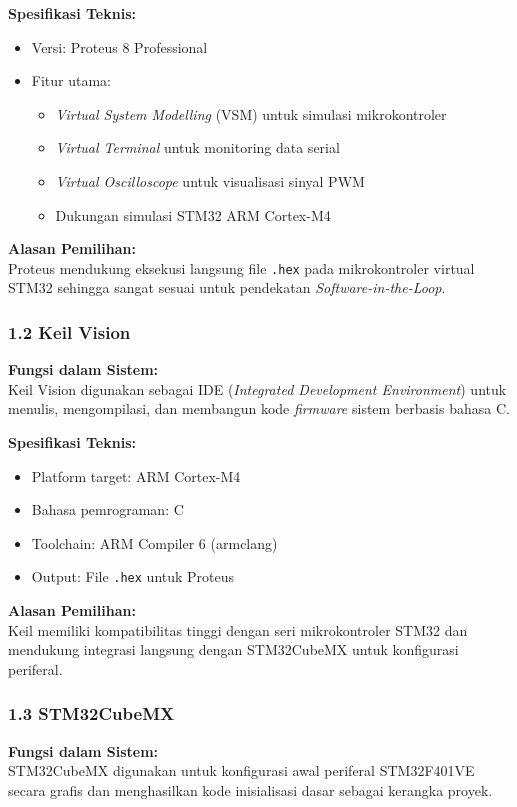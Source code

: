 \documentclass[11pt,a4paper]{article}
\begin{document}
\noindent\textbf{Spesifikasi Teknis:}
\begin{itemize}
    \item Versi: Proteus 8 Professional
    \item Fitur utama:
    \begin{itemize}
        \item \textit{Virtual System Modelling} (VSM) untuk simulasi mikrokontroler
        \item \textit{Virtual Terminal} untuk monitoring data serial
        \item \textit{Virtual Oscilloscope} untuk visualisasi sinyal PWM
        \item Dukungan simulasi STM32 ARM Cortex-M4
    \end{itemize}
\end{itemize}
\vspace{6pt}
\noindent\textbf{Alasan Pemilihan:}\\
Proteus mendukung eksekusi langsung file \texttt{.hex} pada mikrokontroler
virtual STM32 sehingga sangat sesuai untuk pendekatan
\textit{Software-in-the-Loop}.
\subsubsection*{1.2 Keil \textmu{}Vision}
\noindent\textbf{Fungsi dalam Sistem:}\\
Keil \textmu{}Vision digunakan sebagai IDE (\textit{Integrated Development Environment})
untuk menulis, mengompilasi, dan membangun kode \textit{firmware} sistem berbasis bahasa C.
\vspace{6pt}

\noindent\textbf{Spesifikasi Teknis:}
\begin{itemize}
    \item Platform target: ARM Cortex-M4
    \item Bahasa pemrograman: C
    \item Toolchain: ARM Compiler 6 (armclang)
    \item Output: File \texttt{.hex} untuk Proteus
\end{itemize}
\vspace{6pt}
\noindent\textbf{Alasan Pemilihan:}\\
Keil memiliki kompatibilitas tinggi dengan seri mikrokontroler STM32 dan mendukung
integrasi langsung dengan STM32CubeMX untuk konfigurasi periferal.
\subsubsection*{1.3 STM32CubeMX}
\noindent\textbf{Fungsi dalam Sistem:}\\
STM32CubeMX digunakan untuk konfigurasi awal periferal STM32F401VE secara grafis
dan menghasilkan kode inisialisasi dasar sebagai kerangka proyek.
\vspace{6pt}
\end{document}
